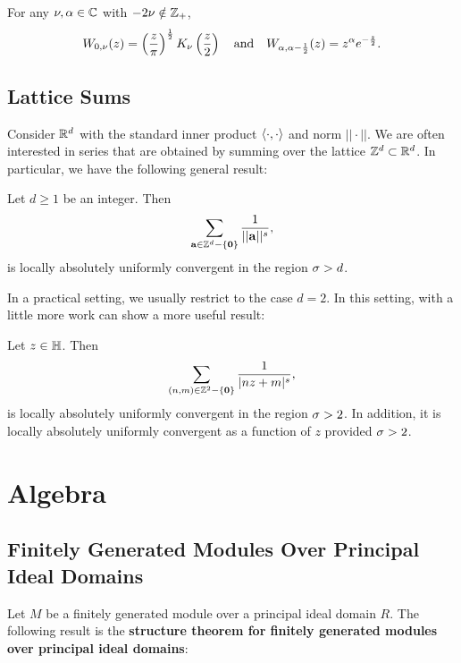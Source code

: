     \begin{theorem}\label{thm:Whittaker_special_cases}
      For any $\nu,\alpha \in \mathbb{C}$ with $-2\nu \notin \mathbb{Z}_{+}$,
      \[
        W_{0,\nu}(z) = \left(\frac{z}{\pi}\right)^{\frac{1}{2}}K_{\nu}\left(\frac{z}{2}\right) \quad \text{and} \quad W_{\alpha,\alpha-\frac{1}{2}}(z) = z^{\alpha}e^{-\frac{z}{2}}.
      \]
    \end{theorem}
  \section{Lattice Sums}
    Consider $\mathbb{R}^{d}$ with the standard inner product $\langle\cdot,\cdot\rangle$ and norm $||\cdot||$. We are often interested in series that are obtained by summing over the lattice $\mathbb{Z}^{d} \subset \mathbb{R}^{d}$. In particular, we have the following general result:

    \begin{theorem}
      Let $d \ge 1$ be an integer. Then
      \[
        \sum_{\mathbf{a} \in \mathbb{Z}^{d}-\{\mathbf{0}\}}\frac{1}{||\mathbf{a}||^{s}},
      \]
      is locally absolutely uniformly convergent in the region $\sigma > d$.
    \end{theorem}

    In a practical setting, we usually restrict to the case $d = 2$. In this setting, with a little more work can show a more useful result:

    \begin{proposition}\label{prop:general_lattice_sum_convergence_for_two_variables}
      Let $z \in \mathbb{H}$. Then
      \[
        \sum_{(n,m) \in \mathbb{Z}^{2}-\{\mathbf{0}\}}\frac{1}{|nz+m|^{s}},
      \]
      is locally absolutely uniformly convergent in the region $\sigma > 2$. In addition, it is locally absolutely uniformly convergent as a function of $z$ provided $\sigma > 2$.
    \end{proposition}
\chapter{Algebra}
  \section{Finitely Generated Modules Over Principal Ideal Domains}
    Let $M$ be a finitely generated module over a principal ideal domain $R$. The following result is the \textbf{structure theorem for finitely generated modules over principal ideal domains}:

